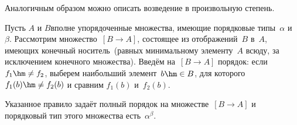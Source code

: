 Аналогичным образом можно описать возведение в произвольную
степень.

Пусть $A$ и $B$\т вполне упорядоченные множества,  имеющие порядковые
типы~$\alpha$ и~$\beta$. Рассмотрим множество~$[B\to A]$,\index{$[B\to A]$}
состоящее из отображений~$B$ в~$A$, имеющих  конечный
носитель\ (равных минимальному элементу~$A$ всюду, за
исключением конечного множества). Введём на~$[B\to A]$
порядок: если~$f_1\hm\ne f_2$, выберем наибольший элемент~$b\hm\in B$,
для которого $f_1(b)\hm\ne f_2(b)$ и сравним $f_1(b)$ и~$f_2(b)$.

\begin{theorem}
        \label{ordinal-power-structure}
Указанное правило задаёт полный порядок на множестве~$[B\to A]$
и порядковый тип этого множества есть~$\alpha^\beta$.
\end{theorem}

